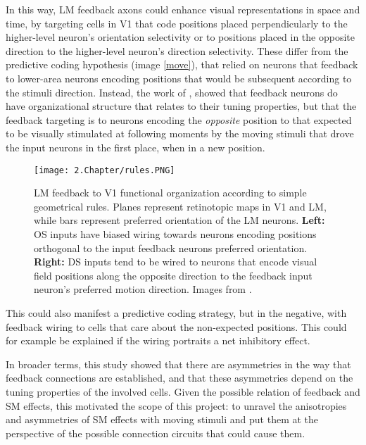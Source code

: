 In this way, LM feedback axons could enhance visual representations in space and time, by targeting cells in V1 that code positions placed perpendicularly to the higher-level neuron's orientation selectivity or to positions placed in the opposite direction to the higher-level neuron's direction selectivity. These differ from the predictive coding hypothesis (image \ref{move}), that relied on neurons that feedback to lower-area neurons encoding positions that would be subsequent according to the stimuli direction. Instead, the work of \cite{Marques2018},  showed that feedback neurons do have organizational structure that relates to their tuning properties, but that the feedback targeting is to neurons encoding the \textit{opposite} position to that expected to be visually stimulated at following moments by the moving stimuli that drove the input neurons in the first place, when in a new position. 

\begin{figure}[H]
\center
\texttt{[image: 2.Chapter/rules.PNG]}
\caption{LM feedback to V1 functional organization according to simple geometrical rules. Planes represent retinotopic maps in V1 and LM, while bars represent preferred orientation of the LM neurons. \newline \textbf{Left:} OS inputs have biased wiring towards neurons encoding positions orthogonal to the input feedback neurons preferred orientation.
\newline \textbf{Right:} DS inputs tend to be wired to neurons that encode visual field positions along the opposite direction to the feedback input neuron's preferred motion direction.
\newline \newline \tiny{Images from \cite{Marques2018}.}}
\label{rules}
\end{figure}

This could also manifest a predictive coding strategy, but in the negative, with feedback wiring to cells that care about the non-expected positions. This could for example be explained if the wiring portraits a net inhibitory effect.

In broader terms, this study showed that there are asymmetries in the way that feedback connections are established, and that these asymmetries depend on the tuning properties of the involved cells. 
Given the possible relation of feedback and SM effects, this motivated the scope of this project: to unravel the anisotropies and asymmetries of SM effects with moving stimuli and put them at the perspective of the possible connection circuits that could cause them.
